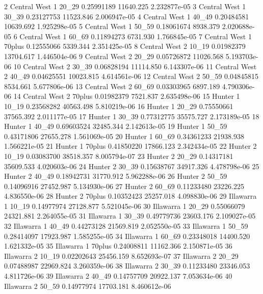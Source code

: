 \documentclass[a4paper]{article}                %
\begin{document}
\begin{Schunk}
\begin{Soutput}
2  Central West   1  20_29       0.25991189 11640.225 2.232877e-05
3  Central West   1  30_39       0.23127753 11523.846 2.006947e-05
4  Central West   1  40_49       0.20484581 10639.692 1.925298e-05
5  Central West   1  50_59       0.18061674  8938.379 2.020688e-05
6  Central West   1  60_69       0.11894273  6731.930 1.766845e-05
7  Central West   1 70plus       0.12555066  5339.344 2.351425e-05
8  Central West   2  10_19       0.01982379 13704.617 1.446504e-06
9  Central West   2  20_29       0.05726872 11026.568 5.193703e-06
10 Central West   2  30_39       0.06828194 11114.850 6.143307e-06
11 Central West   2  40_49       0.04625551 10023.815 4.614561e-06
12 Central West   2  50_59       0.04845815  8534.661 5.677806e-06
13 Central West   2  60_69       0.03303965  6897.189 4.790306e-06
14 Central West   2 70plus       0.01982379  7521.837 2.635498e-06
15       Hunter   1  10_19       0.23568282 40563.498 5.810219e-06
16       Hunter   1  20_29       0.75550661 37565.392 2.011177e-05
17       Hunter   1  30_39       0.77312775 35575.727 2.173189e-05
18       Hunter   1  40_49       0.69603524 32485.344 2.142613e-05
19       Hunter   1  50_59       0.43171806 27655.278 1.561069e-05
20       Hunter   1  60_69       0.34361233 21938.938 1.566221e-05
21       Hunter   1 70plus       0.41850220 17866.123 2.342434e-05
22       Hunter   2  10_19       0.03083700 38518.357 8.005794e-07
23       Hunter   2  20_29       0.14317181 35609.533 4.020603e-06
24       Hunter   2  30_39       0.15638767 34917.326 4.478798e-06
25       Hunter   2  40_49       0.18942731 31770.912 5.962288e-06
26       Hunter   2  50_59       0.14096916 27452.987 5.134930e-06
27       Hunter   2  60_69       0.11233480 23226.225 4.836550e-06
28       Hunter   2 70plus       0.10352423 25257.018 4.098830e-06
29    Illawarra   1  10_19       0.14977974 27128.877 5.521045e-06
30    Illawarra   1  20_29       0.55066079 24321.881 2.264055e-05
31    Illawarra   1  30_39       0.49779736 23603.176 2.109027e-05
32    Illawarra   1  40_49       0.44273128 21569.819 2.052550e-05
33    Illawarra   1  50_59       0.28414097 17923.987 1.585255e-05
34    Illawarra   1  60_69       0.23348018 14400.520 1.621332e-05
35    Illawarra   1 70plus       0.24008811 11162.366 2.150871e-05
36    Illawarra   2  10_19       0.02202643 25456.159 8.652693e-07
37    Illawarra   2  20_29       0.07488987 22969.824 3.260359e-06
38    Illawarra   2  30_39       0.11233480 23346.053 4.811726e-06
39    Illawarra   2  40_49       0.14757709 20922.137 7.053634e-06
40    Illawarra   2  50_59       0.14977974 17703.181 8.460612e-06

\end{Soutput}
\end{Schunk}
\end{document}
